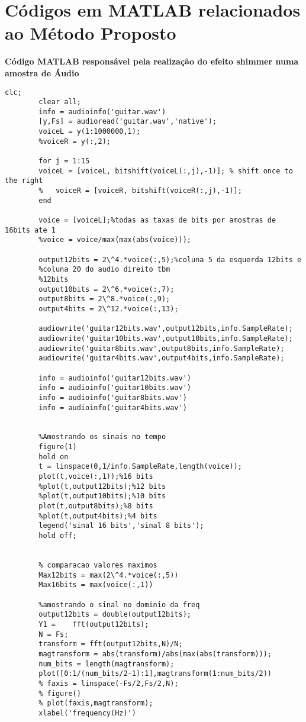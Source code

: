 \section{Códigos em MATLAB relacionados ao Método Proposto}

\textbf{Código MATLAB responsável pela realização do efeito shimmer numa amostra de Áudio}
	
	\begin{lstlisting}[caption={Code: "audio.m":Código Matlab para a realização da análise espectral do efeito shimmer em um sinal de áudio de 12bits/44100Hz},label={codigo01}]
		clc;
		clear all;
		info = audioinfo('guitar.wav')
		[y,Fs] = audioread('guitar.wav','native');
		voiceL = y(1:1000000,1);
		%voiceR = y(:,2);
		
		for j = 1:15
		voiceL = [voiceL, bitshift(voiceL(:,j),-1)]; % shift once to the right
		%   voiceR = [voiceR, bitshift(voiceR(:,j),-1)];
		end
		
		voice = [voiceL];%todas as taxas de bits por amostras de 16bits ate 1
		%voice = voice/max(max(abs(voice)));
		
		output12bits = 2\^4.*voice(:,5);%coluna 5 da esquerda 12bits e 
		%coluna 20 do audio direito tbm
		%12bits
		output10bits = 2\^6.*voice(:,7);
		output8bits = 2\^8.*voice(:,9);
		output4bits = 2\^12.*voice(:,13);
		
		audiowrite('guitar12bits.wav',output12bits,info.SampleRate);
		audiowrite('guitar10bits.wav',output10bits,info.SampleRate);
		audiowrite('guitar8bits.wav',output8bits,info.SampleRate);
		audiowrite('guitar4bits.wav',output4bits,info.SampleRate);
		
		info = audioinfo('guitar12bits.wav')
		info = audioinfo('guitar10bits.wav')
		info = audioinfo('guitar8bits.wav')
		info = audioinfo('guitar4bits.wav')
		
		
		%Amostrando os sinais no tempo
		figure(1)
		hold on
		t = linspace(0,1/info.SampleRate,length(voice));
		plot(t,voice(:,1));%16 bits
		%plot(t,output12bits);%12 bits
		%plot(t,output10bits);%10 bits
		plot(t,output8bits);%8 bits
		%plot(t,output4bits);%4 bits
		legend('sinal 16 bits','sinal 8 bits');
		hold off;
		
		
		% comparacao valores maximos
		Max12bits = max(2\^4.*voice(:,5))
		Max16bits = max(voice(:,1))
		
		%amostrando o sinal no dominio da freq
		output12bits = double(output12bits);
		Y1 =    fft(output12bits);
		N = Fs;
		transform = fft(output12bits,N)/N;
		magtransform = abs(transform)/abs(max(abs(transform)));
		num_bits = length(magtransform);
		plot([0:1/(num_bits/2-1):1],magtransform(1:num_bits/2))
		% faxis = linspace(-Fs/2,Fs/2,N);
		% figure()
		% plot(faxis,magtransform);
		xlabel('frequency(Hz)')
		

\end{lstlisting}
